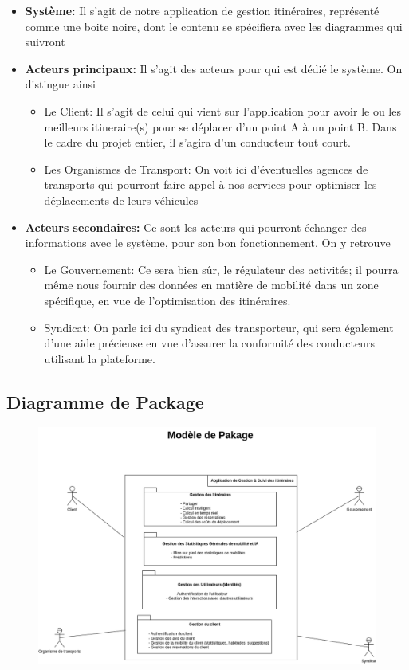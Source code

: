 \begin{itemize}
    \item \textbf{Système: } Il s'agit de notre application de gestion itinéraires, représenté comme une boite noire, dont le contenu se spécifiera avec les diagrammes qui suivront
    \item \textbf{Acteurs principaux:} Il s'agit des acteurs pour qui est dédié le système. On distingue ainsi
          \begin{itemize}
              \item Le Client: Il s'agit de celui qui vient sur l'application pour avoir le ou les meilleurs itineraire(s) pour se déplacer d'un point A à un point B. Dans le cadre du projet entier, il s'agira d'un conducteur tout court.
              \item Les Organismes de Transport: On voit ici d'éventuelles agences de transports qui pourront faire appel à nos services pour optimiser les déplacements de leurs véhicules
          \end{itemize}
    \item \textbf{Acteurs secondaires:} Ce sont les acteurs qui pourront échanger des informations avec le système, pour son bon fonctionnement. On y retrouve
          \begin{itemize}
              \item Le Gouvernement: Ce sera bien sûr, le régulateur des activités; il pourra même nous fournir des données en matière de mobilité dans un zone spécifique, en vue de l'optimisation des itinéraires.
              \item Syndicat: On parle ici du syndicat des transporteur, qui sera également d'une aide précieuse en vue d'assurer la conformité des conducteurs utilisant la plateforme.
          \end{itemize}
\end{itemize}

\subsection{Diagramme de Package}

\begin{figure}[h]
    \centering
    \includegraphics[width=0.8\linewidth]{Images/Diagramme_Package.png}
\end{figure}

